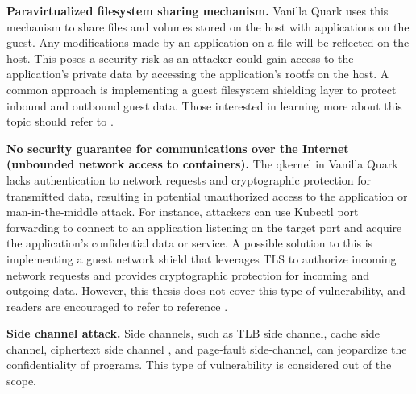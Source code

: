 \textbf{Paravirtualized filesystem sharing mechanism.} Vanilla Quark uses this mechanism to share files and volumes stored on the host with applications on the guest. Any modifications made by an application on a file will be reflected on the host. This poses a security risk as an attacker could 
gain access to the application’s private data by accessing the application's rootfs on the host. A common approach is implementing a guest filesystem shielding layer to protect inbound and outbound guest data. Those interested in learning more about this topic should 
refer to \cite*{file_system_shield}.


\textbf{No security guarantee for communications over the Internet (unbounded network access to containers).} The qkernel in Vanilla Quark lacks authentication to network requests and cryptographic protection for transmitted data, resulting in potential unauthorized access to the application or 
man-in-the-middle attack\cite*{Man_in_the_middle_attack}. For instance, attackers can use Kubectl port forwarding to connect to an application listening on the target port and acquire the application’s confidential data or service. A possible solution to this is implementing a guest network shield that leverages TLS to authorize 
incoming network requests and provides cryptographic protection for incoming and outgoing data. However, this thesis does not cover this type of vulnerability, and readers are encouraged to refer to reference \cite*{network_shiled}.

\textbf{Side channel attack.} Side channels, such as TLB side channel\cite*{217454}, cache side channel\cite*{7163050}, ciphertext side channel\cite*{274707} , and page-fault side-channel\cite*{236278}, can jeopardize the confidentiality of programs.  This type of vulnerability is considered out of the scope.





